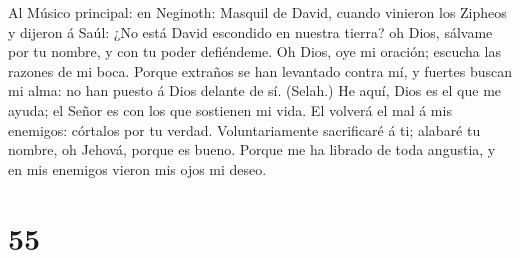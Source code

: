 Al Músico principal: en Neginoth: Masquil de David,
cuando vinieron los Zipheos y dijeron á Saúl: ¿No está David escondido
en nuestra tierra? oh Dios, sálvame por tu nombre, y con tu poder
defiéndeme.  Oh Dios, oye mi oración; escucha las razones
de mi boca.  Porque extraños se han levantado contra mí, y
fuertes buscan mi alma: no han puesto á Dios delante de sí. (Selah.)
 He aquí, Dios es el que me ayuda; el Señor es con los que
sostienen mi vida.  El volverá el mal á mis enemigos:
córtalos por tu verdad.  Voluntariamente sacrificaré á ti;
alabaré tu nombre, oh Jehová, porque es bueno.  Porque me
ha librado de toda angustia, y en mis enemigos vieron mis ojos mi deseo.

\hypertarget{section-54}{%
\section{55}\label{section-54}}

